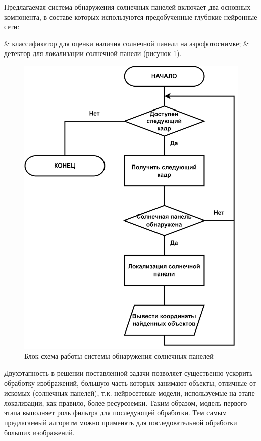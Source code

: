 Предлагаемая система обнаружения солнечных панелей включает два основных компонента, в составе которых используются предобученные глубокие нейронные сети: 

\begin{easylistNum}
    & классификатор для оценки наличия солнечной панели на аэрофотоснимке;
    & детектор для локализации солнечной панели (рисунок \ref{fig:solar_system_arch}).
\end{easylistNum}

\begin{figure}[ht]
	\centering
	\includegraphics[width=12cm]{man-source/images/ch4/pic4-16a.png}
	\caption{Блок-схема работы системы обнаружения солнечных панелей}
	\label{fig:solar_system_arch}
\end{figure}

Двухэтапность в решении поставленной задачи позволяет существенно ускорить обработку изображений, большую часть которых занимают объекты, отличные от искомых (солнечных панелей), т.к. нейросетевые модели, используемые на этапе локализации, как правило, более ресурсоемки. Таким образом, модель первого этапа выполняет роль фильтра для последующей обработки. Тем самым предлагаемый алгоритм можно применять для последовательной обработки больших изображений.

